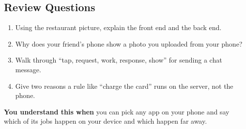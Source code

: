 \subsection*{Review Questions}\label{01-two-sides-of-every-app:review-questions}

\begin{enumerate}
\def\labelenumi{\arabic{enumi}.}
\tightlist
\item
  Using the restaurant picture, explain the front end and the back end.
\item
  Why does your friend's phone show a photo you uploaded from your phone?
\item
  Walk through ``tap, request, work, response, show'' for sending a chat message.
\item
  Give two reasons a rule like ``charge the card'' runs on the server, not the phone.
\end{enumerate}

\begin{understandbox}

\textbf{You understand this when} you can pick any app on your phone and say which of its jobs happen on your device and which happen far away.

\end{understandbox}
